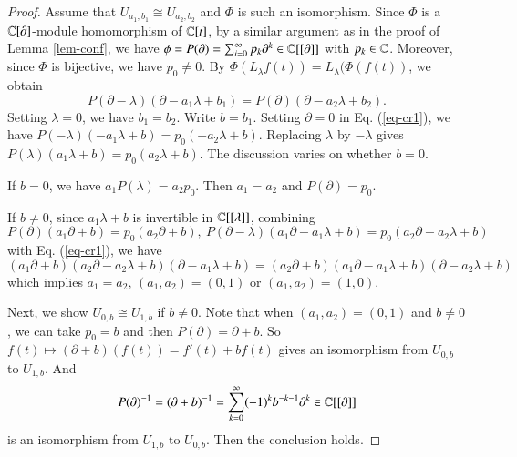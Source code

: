 \documentclass[12pt]{amsart}
\begin{document}
\begin{proof}
Assume that $U_{a_1,b_1}\cong U_{a_2,b_2}$ and $\Phi$ is such an isomorphism.
Since $\Phi$ is a $\mathbb{C}[\partial]$-module homomorphism of $\mathbb{C}[t]$, by a similar argument as in the proof of Lemma \ref{lem-conf},
we have $\phi=P(\partial)=\sum_{i=0}^\infty p_k \partial^k\in\mathbb{C}[[\partial]]$ with $p_k\in\mathbb{C}$.
Moreover, since $\Phi$ is bijective, we have $p_0\neq 0$.
By $\Phi(L_\lambda f(t))=L_\lambda(\Phi(f(t))$, we obtain
\begin{equation}\label{eq-cr1}
P(\partial-\lambda)(\partial-a_1 \lambda+b_1)=P(\partial)(\partial-a_2 \lambda+b_2).
\end{equation}
Setting $\lambda=0$, we have $b_1=b_2$. Write $b=b_1$. Setting $\partial=0$ in Eq. (\ref{eq-cr1}), we have
$P(-\lambda)(-a_1 \lambda+b)=p_0(-a_2 \lambda+b)$. Replacing $\lambda$ by $-\lambda$ gives
$P(\lambda)(a_1 \lambda+b)=p_0(a_2 \lambda+b)$. The discussion varies on whether $b=0$.

If $b=0$, we have $a_1P(\lambda)=a_2p_0$. Then $a_1=a_2$ and $P(\partial)=p_0$.

If $b\neq 0$, since $a_1 \lambda+b$ is invertible in $\mathbb{C}[[\lambda]]$, combining
$$P(\partial)(a_1 \partial+b)=p_0(a_2 \partial+b),\ P(\partial-\lambda)(a_1 \partial-a_1\lambda+b)=p_0(a_2 \partial-a_2\lambda+b)$$ with Eq. (\ref{eq-cr1}), we have
$$(a_1 \partial+b)(a_2 \partial-a_2\lambda+b)(\partial-a_1 \lambda+b)=(a_2 \partial+b)(a_1 \partial-a_1\lambda+b)(\partial-a_2 \lambda+b)$$
which implies $a_1=a_2$, $(a_1, a_2)=(0,1)$ or $(a_1,a_2)=(1,0)$.

Next, we show $U_{0,b}\cong U_{1,b}$ if $b\neq 0$.
Note that when $(a_1,a_2)=(0,1)$ and $b\neq0$, we can take $p_0=b$ and then $P(\partial)=\partial+b$. So $f(t)\mapsto (\partial+b)(f(t))=f'(t)+bf(t)$ gives an isomorphism from $U_{0,b}$ to $U_{1,b}$. And $$P(\partial)^{-1}=(\partial+b)^{-1}=\sum_{k=0}^\infty (-1)^kb^{-k-1}\partial^k\in\mathbb{C}[[\partial]]$$ is an isomorphism from $U_{1,b}$ to $U_{0,b}$.
Then the conclusion holds.
\end{proof}
\end{document}
